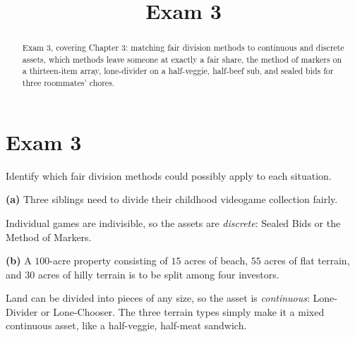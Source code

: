\documentclass[12pt]{ximera}
\title{Exam 3}
\begin{document}
\begin{abstract}
Exam 3, covering Chapter 3: matching fair division methods to continuous and discrete
assets, which methods leave someone at exactly a fair share, the method of markers on a
thirteen-item array, lone-divider on a half-veggie, half-beef sub, and sealed bids for
three roommates' chores.
\end{abstract}
\maketitle

\section*{Exam 3}

\begin{problem}
Identify which fair division methods could possibly apply to each situation.

\begin{prompt}
\textbf{(a)} Three siblings need to divide their childhood videogame collection fairly.

\begin{selectAll}
\end{selectAll}

\begin{feedback}
Individual games are indivisible, so the assets are \emph{discrete}: Sealed Bids or
the Method of Markers.
\end{feedback}
\end{prompt}

\begin{prompt}
\textbf{(b)} A $100$-acre property consisting of $15$ acres of beach, $55$ acres of flat
terrain, and $30$ acres of hilly terrain is to be split among four investors.

\begin{selectAll}
\end{selectAll}

\begin{feedback}
Land can be divided into pieces of any size, so the asset is \emph{continuous}:
Lone-Divider or Lone-Chooser. The three terrain types simply make it a mixed
continuous asset, like a half-veggie, half-meat sandwich.
\end{feedback}
\end{prompt}
\end{problem}
\end{document}
